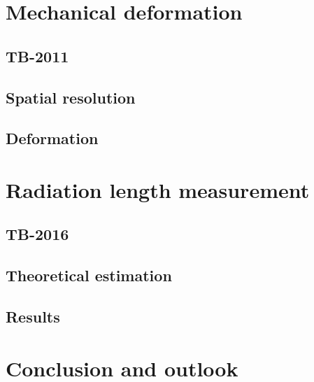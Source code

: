\documentclass{beamer}
\begin{document}
    
  \section{Mechanical deformation}
    \subsection{TB-2011}
    \subsection{Spatial resolution}
    \subsection{Deformation}
  
  \section{Radiation length measurement}
    \subsection{TB-2016}
    \subsection{Theoretical estimation}
    \subsection{Results}
    
  \section{Conclusion and outlook} 
\end{document}
